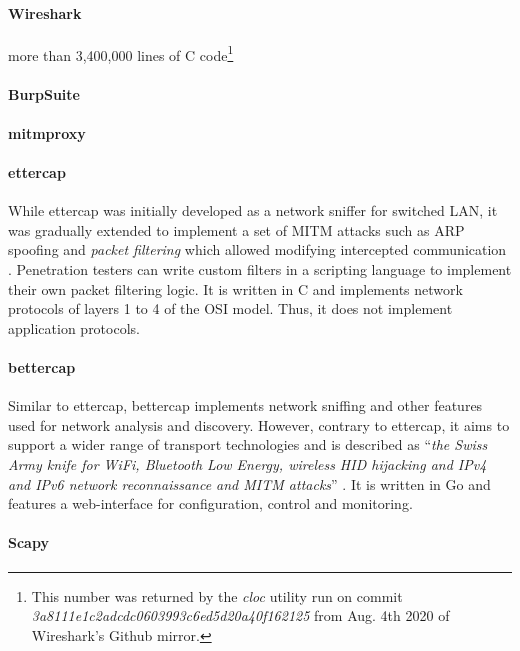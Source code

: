 \paragraph{Wireshark} %
more than 3,400,000 lines of C code\footnote{This number was returned by the \emph{cloc} utility run on commit \emph{3a8111e1c2adcdc0603993c6ed5d20a40f162125} from Aug. 4th 2020 of Wireshark's Github mirror.}

\paragraph{BurpSuite} %
\paragraph{mitmproxy} %
\paragraph{ettercap} While ettercap was initially developed as a network sniffer for switched \ac{LAN}, it was gradually extended to implement a set of \ac{MITM} attacks such as \ac{ARP} spoofing and \emph{packet filtering} which allowed modifying intercepted communication \cite{ettercap}. Penetration testers can write custom filters in a scripting language to implement their own packet filtering logic. It is written in C and implements network protocols of layers 1 to 4 of the \ac{OSI} model. Thus, it does not implement application protocols.
\paragraph{bettercap} Similar to ettercap, bettercap implements network sniffing and other features used for network analysis and discovery. However, contrary to ettercap, it aims to support a wider range of transport technologies and is described as \enquote{\emph{the Swiss Army knife for WiFi, Bluetooth Low Energy, wireless HID hijacking and IPv4 and IPv6 network reconnaissance and MITM attacks}} \cite{bettercap}. It is written in Go and features a web-interface for configuration, control and monitoring.
\paragraph{Scapy}
